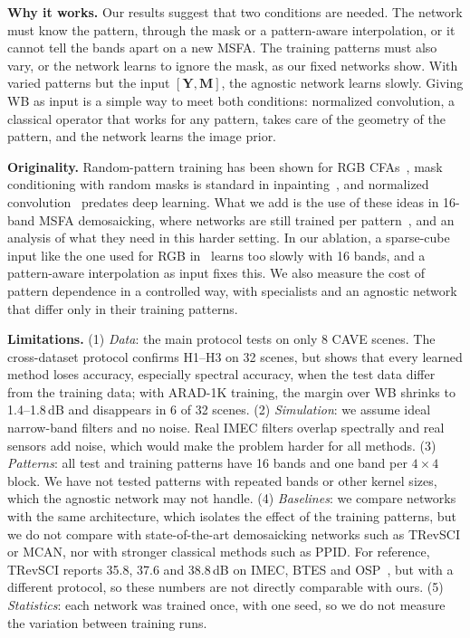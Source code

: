 \documentclass{article}
\def\Y{{\mathbf Y}}
\def\M{{\mathbf M}}
\begin{document}
\textbf{Why it works.} Our results suggest that two conditions are needed.
The network must know the pattern, through the mask or a pattern-aware
interpolation, or it cannot tell the bands apart on a new MSFA. The training
patterns must also vary, or the network learns to ignore the mask, as our
fixed networks show. With varied patterns but the input $[\Y,\M]$, the
agnostic network learns slowly. Giving WB as input is a simple way to meet
both conditions: normalized convolution, a classical operator that works for
any pattern, takes care of the geometry of the pattern, and the network
learns the image prior.

\textbf{Originality.} Random-pattern training has been shown for RGB
CFAs~\cite{bourrier2022}, mask conditioning with random masks is standard in
inpainting~\cite{liu2018}, and normalized convolution~\cite{knutsson1993}
predates deep learning. What we add is the use of these ideas in 16-band
MSFA demosaicking, where networks are still trained per
pattern~\cite{feng2021,diaz2023}, and an analysis of what they need in this
harder setting. In our ablation, a sparse-cube input like the one used for
RGB in~\cite{bourrier2022} learns too slowly with 16 bands, and a
pattern-aware interpolation as input fixes this. We also measure the cost of
pattern dependence in a controlled way, with specialists and an agnostic
network that differ only in their training patterns.

\textbf{Limitations.} (1) \emph{Data}: the main protocol tests on only 8 CAVE scenes. The
cross-dataset protocol confirms H1--H3 on 32 scenes, but shows that every
learned method loses accuracy, especially spectral accuracy, when the test
data differ from the training data; with ARAD-1K training, the margin over
WB shrinks to 1.4--1.8\,dB and disappears in 6 of 32 scenes. (2)
\emph{Simulation}: we assume ideal narrow-band filters and no noise. Real
IMEC filters overlap spectrally and real sensors add noise, which would make
the problem harder for all methods. (3) \emph{Patterns}: all test and
training patterns have 16 bands and one band per $4\times4$ block. We have
not tested patterns with repeated bands or other kernel sizes, which the
agnostic network may not handle. (4) \emph{Baselines}: we compare networks
with the same architecture, which isolates the effect of the training
patterns, but we do not compare with state-of-the-art demosaicking networks
such as TRevSCI or MCAN, nor with stronger classical methods such as PPID.
For reference, TRevSCI reports 35.8, 37.6 and 38.8\,dB on IMEC, BTES and
OSP~\cite{diaz2023}, but with a different protocol, so these numbers are not
directly comparable with ours. (5) \emph{Statistics}: each network was
trained once, with one seed, so we do not measure the variation between
training runs.
\end{document}
